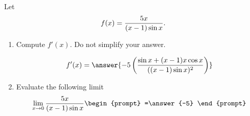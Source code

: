 \documentclass{ximera}
\begin{document}
\begin{exercise}


Let 
\[
f(x)=\frac{5x}{(x-1)\sin x}\ldotp
\]
\begin{enumerate}%
\item Compute $f'(x)$. Do not simplify your answer.
  \begin{prompt}
    \[
    f'(x)=\answer{-5\left(\frac{\sin x+(x-1)x\cos x}{((x-1)\sin x)^2}\right)}
    \]
  \end{prompt}
  \item Evaluate the following limit
  \[
  \lim_{x\to 0}\frac{5x}{(x-1)\sin x}
  \begin{prompt}
    =\answer{-5}
  \end{prompt}
  \]
\end{enumerate}
\end{exercise}
\end{document}
